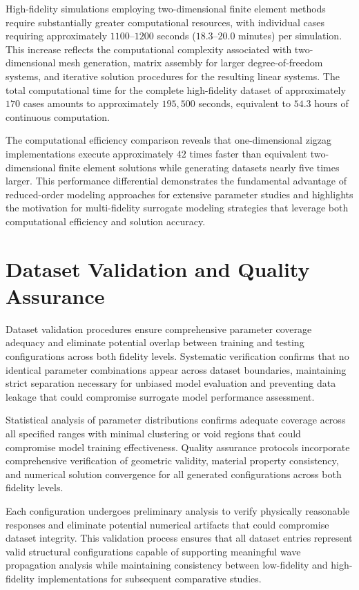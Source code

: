 \documentclass[12pt,a4paper]{report}
\begin{document}
High-fidelity simulations employing two-dimensional finite element methods require substantially greater computational resources, with individual cases requiring approximately $1100$--$1200$ seconds ($18.3$--$20.0$ minutes) per simulation. This increase reflects the computational complexity associated with two-dimensional mesh generation, matrix assembly for larger degree-of-freedom systems, and iterative solution procedures for the resulting linear systems. The total computational time for the complete high-fidelity dataset of approximately $170$ cases amounts to approximately $195,500$ seconds, equivalent to $54.3$ hours of continuous computation.

The computational efficiency comparison reveals that one-dimensional zigzag implementations execute approximately $42$ times faster than equivalent two-dimensional finite element solutions while generating datasets nearly five times larger. This performance differential demonstrates the fundamental advantage of reduced-order modeling approaches for extensive parameter studies and highlights the motivation for multi-fidelity surrogate modeling strategies that leverage both computational efficiency and solution accuracy.

\section{Dataset Validation and Quality Assurance}

Dataset validation procedures ensure comprehensive parameter coverage adequacy and eliminate potential overlap between training and testing configurations across both fidelity levels. Systematic verification confirms that no identical parameter combinations appear across dataset boundaries, maintaining strict separation necessary for unbiased model evaluation and preventing data leakage that could compromise surrogate model performance assessment.

Statistical analysis of parameter distributions confirms adequate coverage across all specified ranges with minimal clustering or void regions that could compromise model training effectiveness. Quality assurance protocols incorporate comprehensive verification of geometric validity, material property consistency, and numerical solution convergence for all generated configurations across both fidelity levels.

Each configuration undergoes preliminary analysis to verify physically reasonable responses and eliminate potential numerical artifacts that could compromise dataset integrity. This validation process ensures that all dataset entries represent valid structural configurations capable of supporting meaningful wave propagation analysis while maintaining consistency between low-fidelity and high-fidelity implementations for subsequent comparative studies.
\end{document}
